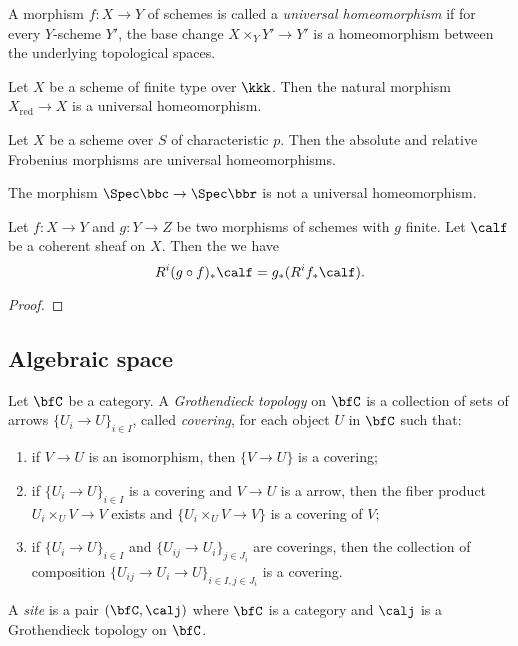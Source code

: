     \begin{definition}\label{def:universally_homeomorphism}
        A morphism \(f: X \to Y\) of schemes is called a \emph{universal homeomorphism} 
        if for every \(Y\)-scheme \(Y'\), the base change \(X \times_Y Y' \to Y'\) is a homeomorphism between the underlying topological spaces.
    \end{definition}

    \begin{example}\label{eg:universal_homeomorphism}
        Let \(X\) be a scheme of finite type over \(\kkk\).
        Then the natural morphism \(X_{\text{red}} \to X\) is a universal homeomorphism.

        Let \(X\) be a scheme over \(S\) of characteristic \(p\).
        Then the absolute and relative Frobenius morphisms are universal homeomorphisms.

        The morphism \(\Spec \bbc \to \Spec \bbr\) is not a universal homeomorphism.
    \end{example}

    \begin{lemma}\label{lem:degeneration_of_Grothendieck_spectral_sequence}
        Let \(f: X \to Y\) and \(g: Y \to Z\) be two morphisms of schemes with \(g\) finite.
        Let \(\calf\) be a coherent sheaf on \(X\).
        Then the we have 
        \[ R^i(g \circ f)_* \calf = g_*(R^if_* \calf). \]
    \end{lemma}
    \begin{proof}
    \end{proof}


\subsection{Algebraic space}

    \begin{definition}\label{def:Grothendieck_topology_and_site}
        Let \(\bfC\) be a category.
        A \emph{Grothendieck topology} on \(\bfC\) is a collection of sets of arrows \(\{U_i \to U\}_{i \in I}\), called \emph{covering}, for each object \(U\) in \(\bfC\) such that:
        \begin{enumerate}
            \item if \(V \to U\) is an isomorphism, then \(\{V \to U\}\) is a covering;
            \item if \(\{U_i \to U\}_{i \in I}\) is a covering and \(V \to U\) is a arrow, then the fiber product \(U_i \times_U V \to V\) exists and \(\{U_i \times_U V \to V\}\) is a covering of \(V\);
            \item if \(\{U_i \to U\}_{i \in I}\) and \(\{U_{ij} \to U_{i}\}_{j \in J_i}\) are coverings, then the collection of composition \(\{U_{ij} \to U_i \to U\}_{i\in I, j\in J_i}\) is a covering.
        \end{enumerate}
        A \emph{site} is a pair \((\bfC, \calj)\) where \(\bfC\) is a category and \(\calj\) is a Grothendieck topology on \(\bfC\).
    \end{definition}

